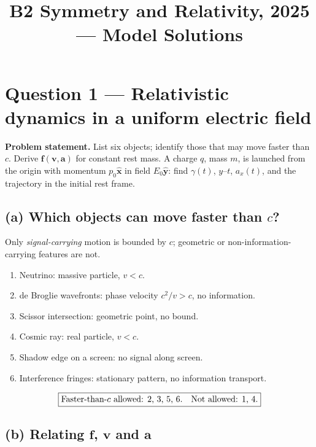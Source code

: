 \documentclass[11pt]{article}
\title{B2 Symmetry and Relativity, 2025 --- Model Solutions}
\author{}
\date{}
\begin{document}
\maketitle

\section*{Question 1 --- Relativistic dynamics in a uniform electric field}

\textbf{Problem statement.} List six objects; identify those that may move faster than $c$. Derive $\bm f(\bm v,\bm a)$ for constant rest mass. A charge $q$, mass $m$, is launched from the origin with momentum $p_0\hat{\bm x}$ in field $E_0\hat{\bm y}$: find $\gamma(t)$, $y$--$t$, $a_x(t)$, and the trajectory in the initial rest frame.

\subsection*{(a) Which objects can move faster than $c$?}

Only \emph{signal-carrying} motion is bounded by $c$; geometric or non-information-carrying features are not.
\begin{enumerate}
\item Neutrino: massive particle, $v<c$.
\item de Broglie wavefronts: phase velocity $c^2/v>c$, no information.
\item Scissor intersection: geometric point, no bound.
\item Cosmic ray: real particle, $v<c$.
\item Shadow edge on a screen: no signal along screen.
\item Interference fringes: stationary pattern, no information transport.
\end{enumerate}
\begin{equation}
\boxed{\text{Faster-than-}c\text{ allowed: 2, 3, 5, 6.\quad Not allowed: 1, 4.}}
\end{equation}

\subsection*{(b) Relating $\bm f$, $\bm v$ and $\bm a$}
\end{document}
